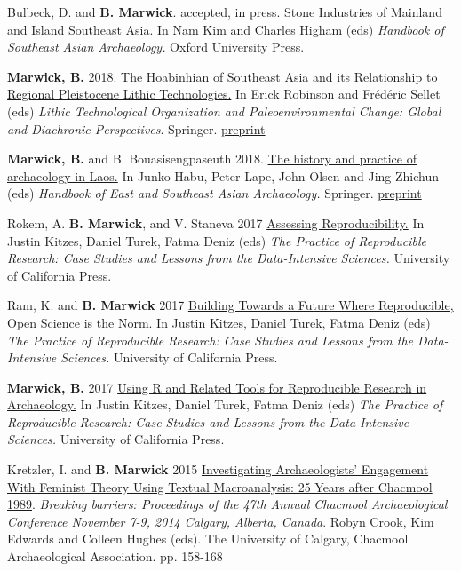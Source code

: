\documentclass[11pt,article,oneside]{memoir}
\begin{document}
{{{{\ind Bulbeck, D. and \textbf{B. Marwick}. accepted, in press. Stone Industries of Mainland and Island Southeast Asia. In Nam Kim and Charles Higham (eds) \textit{Handbook of Southeast Asian Archaeology.} Oxford University Press.

\ind \textbf{Marwick, B.} 2018. \href{https://doi.org/10.1007/978-3-319-64407-3_4}{The Hoabinhian of Southeast Asia and its Relationship to Regional Pleistocene Lithic Technologies.} In Erick Robinson and Frédéric Sellet (eds) \textit{Lithic Technological Organization and Paleoenvironmental Change: Global and Diachronic Perspectives}. Springer. \href{https://doi.org/10.17605/OSF.IO/9PT8G}{preprint}

\ind \textbf{Marwick, B.} and B. Bouasisengpaseuth 2018. \href{https://doi.org/10.1007/978-1-4939-6521-2_8}{The history and practice of archaeology in Laos.} In Junko Habu, Peter Lape, John Olsen and Jing Zhichun (eds) \textit{ Handbook of East and Southeast Asian Archaeology.} Springer. \href{https://dx.doi.org/10.17605/OSF.IO/75ZHC}{preprint}

\ind Rokem, A. \textbf{B. Marwick}, and V. Staneva 2017 \href{https://www.practicereproducibleresearch.org/core-chapters/2-assessment.html}{Assessing Reproducibility.} In Justin Kitzes, Daniel Turek, Fatma Deniz (eds) \textit{The Practice of Reproducible Research: Case Studies and Lessons from the Data-Intensive Sciences.} University of California Press.

\ind Ram, K. and \textbf{B. Marwick} 2017 \href{https://www.practicereproducibleresearch.org/core-chapters/6-future.html}{Building Towards a Future Where Reproducible, Open Science is the Norm.} In Justin Kitzes, Daniel Turek, Fatma Deniz (eds) \textit{The Practice of Reproducible Research: Case Studies and Lessons from the Data-Intensive Sciences.} University of California Press.

\ind \textbf{Marwick, B.} 2017 \href{https://www.practicereproducibleresearch.org/case-studies/benmarwick.html}{Using R and Related Tools for Reproducible Research in Archaeology.} In Justin Kitzes, Daniel Turek, Fatma Deniz (eds) \textit{The Practice of Reproducible Research: Case Studies and Lessons from the Data-Intensive Sciences.} University of California Press. 

\ind Kretzler, I. and \textbf{B. Marwick} 2015 \href{http://faculty.washington.edu/bmarwick/PDFs/Kretzler_Marwick_2014_Chacmool.pdf}{Investigating Archaeologists' Engagement With Feminist Theory Using Textual Macroanalysis: 25 Years after Chacmool 1989}. \textit{Breaking barriers: Proceedings of the 47th Annual Chacmool Archaeological Conference November 7-9, 2014 Calgary, Alberta, Canada}. Robyn Crook, Kim Edwards and Colleen Hughes (eds). The University of Calgary, Chacmool Archaeological Association. pp. 158-168

}}}}
\end{document}
